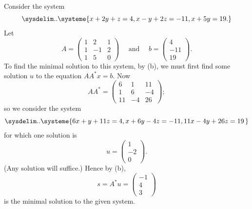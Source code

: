 \begin{example} \label{example 6.3.3}
Consider the system
\[
    \sysdelim..\systeme{
        x + 2y + z = 4,
        x - y + 2z = -11,
        x + 5y = 19.
    }
\]
Let
\[
    A = \begin{pmatrix} 1 & 2 & 1 \\ 1 & -1 & 2 \\ 1 & 5 & 0 \end{pmatrix} \quad \text{ and } \quad
    b = \begin{pmatrix} 4 \\ -11 \\ 19 \end{pmatrix}.
\]
To find the minimal solution to this system, by (b), we must first find some solution \(u\) to the equation \(AA^*x = b\).
Now
\[
    AA^* = \begin{pmatrix}
        6 & 1 & 11 \\
        1 & 6 & -4 \\
        11 & -4 & 26
    \end{pmatrix};
\]
so we consider the system
\[
    \sysdelim..\systeme{
        6x + y + 11z = 4,
        x + 6y - 4z = -11,
        11x - 4y + 26z = 19\,
    }
\]
for which one solution is
\[
    u = \begin{pmatrix} 1 \\ -2 \\ 0 \end{pmatrix}.
\]
(Any solution will suffice.) Hence by (b),
\[
    s = A^* u = \begin{pmatrix} -1 \\ 4 \\ 3 \end{pmatrix}
\]
is the minimal solution to the given system.
\end{example}
